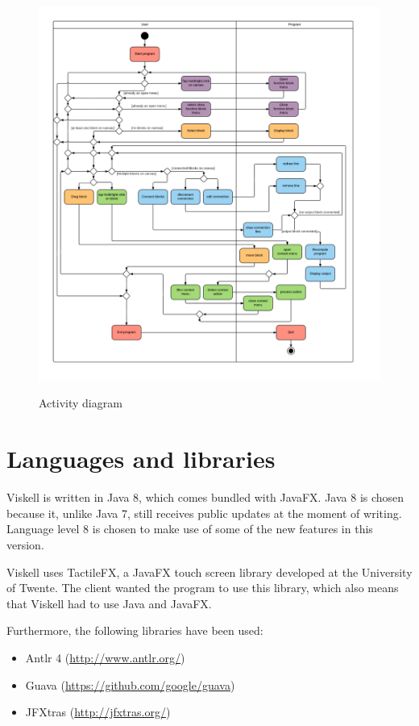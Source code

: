 \begin{figure}[p]
	\centering
	\includegraphics[width=\textwidth]{Images/activitydiagram}
	\label{fig:activitydiagram}
	\caption{Activity diagram}
\end{figure}

\section{Languages and libraries}
Viskell is written in Java 8, which comes bundled with JavaFX. 
Java 8 is chosen because it, unlike Java 7, still receives public updates at the moment of writing.
Language level 8 is chosen to make use of some of the new features in this version.

Viskell uses TactileFX, a JavaFX touch screen library developed at the University of Twente.
The client wanted the program to use this library, which also means that Viskell had to use Java and JavaFX.

Furthermore, the following libraries have been used:

\begin{itemize}
	\item Antlr 4 (\url{http://www.antlr.org/})
	\item Guava (\url{https://github.com/google/guava})
	\item JFXtras (\url{http://jfxtras.org/})
\end{itemize}


